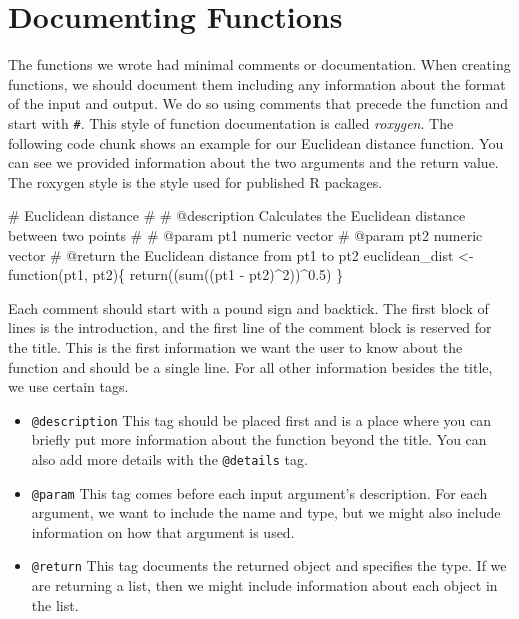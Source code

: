 \documentclass[
  letterpaper,
]{latex/krantz}
\makeatletter
\newenvironment{Shaded}{\begin{snugshade}}{\end{snugshade}}
\newcommand{\CommentTok}[1]{\textcolor[rgb]{0.37,0.37,0.37}{#1}}
\newcommand{\ControlFlowTok}[1]{\textcolor[rgb]{0.00,0.23,0.31}{#1}}
\newcommand{\DecValTok}[1]{\textcolor[rgb]{0.68,0.00,0.00}{#1}}
\newcommand{\FloatTok}[1]{\textcolor[rgb]{0.68,0.00,0.00}{#1}}
\newcommand{\FunctionTok}[1]{\textcolor[rgb]{0.28,0.35,0.67}{#1}}
\newcommand{\NormalTok}[1]{\textcolor[rgb]{0.00,0.23,0.31}{#1}}
\newcommand{\OtherTok}[1]{\textcolor[rgb]{0.00,0.23,0.31}{#1}}
\newcommand{\SpecialCharTok}[1]{\textcolor[rgb]{0.37,0.37,0.37}{#1}}
\newenvironment{kframe}{%
\medskip{}
\setlength{\fboxsep}{.8em}
 \def\at@end@of@kframe{}%
 \ifinner\ifhmode%
  \def\at@end@of@kframe{\end{minipage}}%
  \begin{minipage}{\columnwidth}%
 \fi\fi%
 \def\FrameCommand##1{\hskip\@totalleftmargin \hskip-\fboxsep
 \colorbox{shadecolor}{##1}\hskip-\fboxsep
     \hskip-\linewidth \hskip-\@totalleftmargin \hskip\columnwidth}%
 \MakeFramed {\advance\hsize-\width
   \@totalleftmargin\z@ \linewidth\hsize
   \@setminipage}}%
 {\par\unskip\endMakeFramed%
 \at@end@of@kframe}
\renewenvironment{Shaded}{\begin{kframe}}{\end{kframe}}
\makeatother
\begin{document}
\section{\texorpdfstring{Documenting Functions
}{Documenting Functions }}\label{documenting-functions}

The functions we wrote had minimal comments or documentation. When
creating functions, we should document them including any information
about the format of the input and output. We do so using comments that
precede the function and start with \texttt{\#\textquotesingle{}}. This
style of function documentation is called
\emph{roxygen}. The following code chunk
shows an example for our Euclidean distance function. You can see we
provided information about the two arguments and the return value. The
roxygen style is the style used for published R packages.

\begin{Shaded}
\begin{Highlighting}[]
\CommentTok{\#\textquotesingle{} Euclidean distance}
\CommentTok{\#\textquotesingle{} }
\CommentTok{\#\textquotesingle{} @description Calculates the Euclidean distance between two points}
\CommentTok{\#\textquotesingle{}}
\CommentTok{\#\textquotesingle{} @param pt1 numeric vector }
\CommentTok{\#\textquotesingle{} @param pt2 numeric vector }
\CommentTok{\#\textquotesingle{} @return the Euclidean distance from pt1 to pt2}
\NormalTok{euclidean\_dist }\OtherTok{\textless{}{-}} \ControlFlowTok{function}\NormalTok{(pt1, pt2)\{}
  \FunctionTok{return}\NormalTok{((}\FunctionTok{sum}\NormalTok{((pt1 }\SpecialCharTok{{-}}\NormalTok{ pt2)}\SpecialCharTok{\^{}}\DecValTok{2}\NormalTok{))}\SpecialCharTok{\^{}}\FloatTok{0.5}\NormalTok{)}
\NormalTok{\}}
\end{Highlighting}
\end{Shaded}

Each comment should start with a pound sign and backtick. The first
block of lines is the introduction, and the first line of the comment
block is reserved for the title. This is the first information we want
the user to know about the function and should be a single line. For all
other information besides the title, we use certain tags.

\begin{itemize}
\item
  \texttt{@description} This tag should be placed first and is a place
  where you can briefly put more information about the function beyond
  the title. You can also add more details with the \texttt{@details}
  tag.
\item
  \texttt{@param} This tag comes before each input argument's
  description. For each argument, we want to include the name and type,
  but we might also include information on how that argument is used.
\item
  \texttt{@return} This tag documents the returned object and specifies
  the type. If we are returning a list, then we might include
  information about each object in the list.
\end{itemize}
\end{document}

